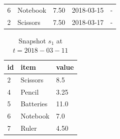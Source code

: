 \begin{center}
\begin{table}
\begin{tabular}{p{1cm}p{2cm}p{3cm}p{3cm}p{2cm}}
		6 & Notebook & 7.50  & 2018-03-15 & - \\ 
		2 & Scissors & 7.50  & 2018-03-17 & - \\ \hline
	\end{tabular}
\end{table}
\begin{table}
	\centering
	\caption{Snapshot $s_1$ at $t = 2018-03-11$}
	\label{table:snapshot_s1}
	\begin{tabular}{p{4cm}p{4cm}p{4cm}}
		\hline
		id & item  & value  \\ \hline
		2 & Scissors & 8.5   \\ 
		4 & Pencil & 3.25   \\ 
		5 & Batteries & 11.0   \\ 
		6 & Notebook & 7.0 \\ 
		7 & Ruler & 4.50   \\ \hline
	\end{tabular}
\end{table}
\end{center}

